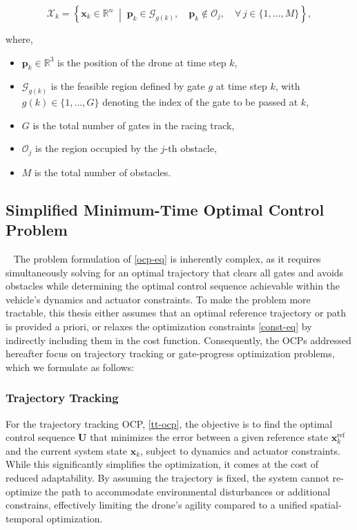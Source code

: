 \begin{equation}
    \mathcal{X}_k = \left\{ \boldsymbol{x}_k \in \mathbb{R}^n \;\middle|\;
        \boldsymbol{p}_k \in \mathcal{G}_{g(k)}, \quad
        \boldsymbol{p}_k \notin \mathcal{O}_j, \quad
        \forall\, j \in \{1, \dots, M\}
    \right\},
    \label{const-eq}
\end{equation}

\noindent where,
\begin{itemize}
    \item[] $\boldsymbol{p}_k \in \mathbb{R}^3$ is the position of the drone at time step $k$,
    \item[] $\mathcal{G}_{g(k)}$ is the feasible region defined by gate $g$ at time step $k$,
            with $g(k) \in \{1, \dots, G\}$ denoting the index of the gate to be passed
            at $k$,
    \item[] $G$ is the total number of gates in the racing track,
    \item[] $\mathcal{O}_j$ is the region occupied by the $j$-th obstacle,
    \item[] $M$ is the total number of obstacles.
\end{itemize}

\subsection{Simplified Minimum-Time Optimal Control Problem}~\label{sec:simpmin-OCP}
The problem formulation of \eqref{ocp-eq} is inherently complex, as it requires simultaneously solving for an optimal trajectory that clears all gates and avoids obstacles while determining the optimal control sequence achievable within the vehicle's dynamics and actuator constraints.
To make the problem more tractable, this thesis either assumes that an optimal reference trajectory or path is provided a priori, or relaxes the optimization constraints \eqref{const-eq} by indirectly including them in the cost function.
Consequently, the \acp{OCP} addressed hereafter focus on trajectory tracking or gate-progress optimization problems, which we formulate as follows:

\subsubsection{Trajectory Tracking}
For the trajectory tracking \ac{OCP}, \eqref{tt-ocp}, the objective is to find the optimal control sequence $\mathbf{U}$ that minimizes the error between a given reference state $\boldsymbol{x}_k^{\text{ref}}$ and the current system state $\boldsymbol{x}_k$, subject to dynamics and actuator constraints.
While this significantly simplifies the optimization, it comes at the cost of reduced adaptability.
By assuming the trajectory is fixed, the system cannot re-optimize the path to accommodate environmental disturbances or additional constrains, effectively limiting the drone's agility compared to a unified spatial-temporal optimization.

